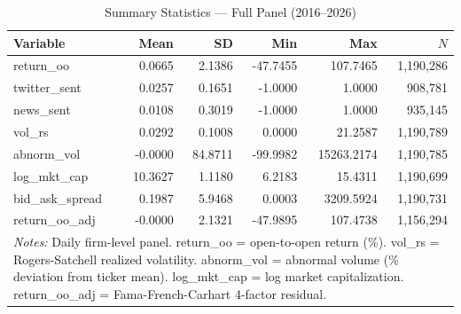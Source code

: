\begin{table}[htbp]
\centering
\caption{Summary Statistics --- Full Panel (2016--2026)}
\label{tab:sumstats}
\small
\begin{tabular}{lrrrrr}
\hline\hline
Variable & Mean & SD & Min & Max & $N$ \\
\hline
  return\_oo & 0.0665 & 2.1386 & -47.7455 & 107.7465 & 1,190,286 \\
  twitter\_sent & 0.0257 & 0.1651 & -1.0000 & 1.0000 & 908,781 \\
  news\_sent & 0.0108 & 0.3019 & -1.0000 & 1.0000 & 935,145 \\
  vol\_rs & 0.0292 & 0.1008 & 0.0000 & 21.2587 & 1,190,789 \\
  abnorm\_vol & -0.0000 & 84.8711 & -99.9982 & 15263.2174 & 1,190,785 \\
  log\_mkt\_cap & 10.3627 & 1.1180 & 6.2183 & 15.4311 & 1,190,699 \\
  bid\_ask\_spread & 0.1987 & 5.9468 & 0.0003 & 3209.5924 & 1,190,731 \\
  return\_oo\_adj & -0.0000 & 2.1321 & -47.9895 & 107.4738 & 1,156,294 \\
\hline\hline
\multicolumn{6}{p{0.95\linewidth}}{\footnotesize \textit{Notes:} Daily firm-level panel. return\_oo = open-to-open return (\%). vol\_rs = Rogers-Satchell realized volatility. abnorm\_vol = abnormal volume (\% deviation from ticker mean). log\_mkt\_cap = log market capitalization. return\_oo\_adj = Fama-French-Carhart 4-factor residual.} \\
\end{tabular}
\end{table}